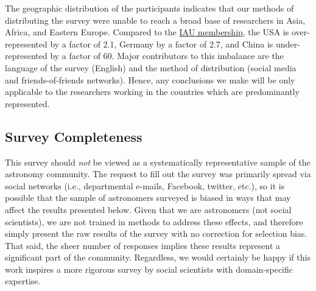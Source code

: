 The geographic distribution of the participants indicates that our methods of distributing the survey were unable to reach a broad base of researchers in Asia, Africa, and Eastern Europe. Compared to the \href{http://www.iau.org/administration/membership/individual/distribution/}{IAU membership}, the USA is over-represented by a factor of 2.1, Germany by a factor of 2.7, and China is under-represented by a factor of 60. Major contributors to this imbalance are the language of the survey (English) and the method of distribution (social media and friends-of-friends networks). Hence, any conclusions we make will be only applicable to the researchers working in the countries which are predominantly represented.

\subsection{Survey Completeness}

This survey should \emph{not} be viewed as a systematically representative sample of the astronomy community.  
The request to fill out the survey was primarily spread via social networks (i.e., departmental e-mails, Facebook, twitter, etc.), so it is possible that the sample of astronomers surveyed is biased in ways that may affect the results presented below.
Given that we are astronomers (not social scientists), we are not trained in methods to address these effects, and therefore simply present the raw results of the survey with no correction for selection bias.
That said, the sheer number of responses implies these results represent a significant part of the community.
Regardless, we would certainly be happy if this work inspires a more rigorous survey by social scientists with domain-specific expertise.

    
  